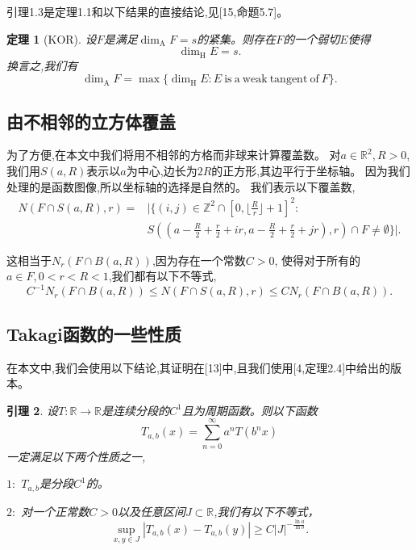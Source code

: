 \documentclass[12pt,a4paper]{article}
\newtheorem{theorem}{定理}[section]
\newtheorem{lemma}[theorem]{引理}
\newcommand{\Hdim}{\mathrm{\dim_H}}
\newcommand{\Adim}{\mathrm{\dim_A}}
\begin{document}
      引理1.3是定理1.1和以下结果的直接结论,见[15,命题5.7]。

      \begin{theorem}[KOR]
            设$F$是满足$\Adim F=s$的紧集。则存在$F$的一个弱切$E$使得
            $$
                  \Hdim E=s.
            $$
            换言之,我们有
            $$
                  \Adim F=\max\{\Hdim E:E~\mathrm{is~a~weak~tangent~of}~F \}.
            $$
      \end{theorem}
      \subsection{由不相邻的立方体覆盖}
       为了方便,在本文中我们将用不相邻的方格而非球来计算覆盖数。
       对$a\in\mathbb{R}^2,R>0$,我们用$S(a,R)$表示以$a$为中心,边长为$2R$的正方形,其边平行于坐标轴。
       因为我们处理的是函数图像,所以坐标轴的选择是自然的。
       我们表示以下覆盖数,
       $$
       \begin{aligned}
            N(F\cap S(a,R),r)=&|\{(i,j)\in\mathbb{Z}^2\cap[0,\lfloor\frac{R}{r}\rfloor+1]^2:\\
            &S((a-\frac{R}{2}+\frac{r}{2}+ir,a-\frac{R}{2}+\frac{r}{2}+jr),r)\cap F\neq\emptyset\}|.
       \end{aligned}
       $$

       这相当于$N_r(F\cap B(a,R))$,因为存在一个常数$C>0$,
       使得对于所有的$a\in F,0<r<R<1$,我们都有以下不等式,
       $$
            C^{-1}N_r(F\cap B(a,R))\le N(F\cap S(a,R),r) \le CN_r(F\cap B(a,R)).
       $$

       \subsection{Takagi函数的一些性质}
       在本文中,我们会使用以下结论,其证明在[13]中,且我们使用[4,定理2.4]中给出的版本。

       \begin{lemma}
            设$T:\mathbb{R}\rightarrow\mathbb{R}$是连续分段的$C^1$且为周期函数。则以下函数
            $$
                  T_{a,b}(x)=\sum_{n=0}^\infty a^nT(b^nx)
            $$
            一定满足以下两个性质之一,

                  $1:$ $T_{a,b}$是分段$C^1$的。

                  $2:$ 对一个正常数$C>0$以及任意区间$J\subset\mathbb{R}$,我们有以下不等式，
                  $$
                        \underset{x,y\in J}{\sup}|T_{a,b}(x)-T_{a,b}(y)|\ge C|J|^{-\frac{\ln a}{\ln b}}.
                  $$

       \end{lemma}
\end{document}
